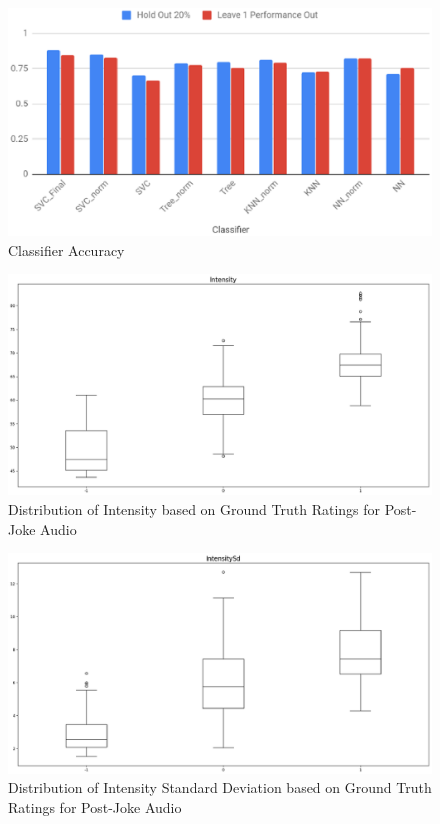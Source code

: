 \documentclass[onecolumn, draftclsnofoot,10pt, compsoc]{IEEEtran}
\begin{document}
\begin{figure}[!h]
\includegraphics[width=\linewidth]{assets/results2.eps}
\caption{Classifier Accuracy}
\end{figure}

\begin{figure}[!h]
\includegraphics[width=\linewidth]{assets/fig1.eps}
\caption{Distribution of Intensity based on Ground Truth Ratings for Post-Joke Audio}
\end{figure}

\begin{figure}[!h]
\includegraphics[width=\linewidth]{assets/fig2.eps}
\caption{Distribution of Intensity Standard Deviation based on Ground Truth Ratings for Post-Joke Audio}
\end{figure}
\end{document}
